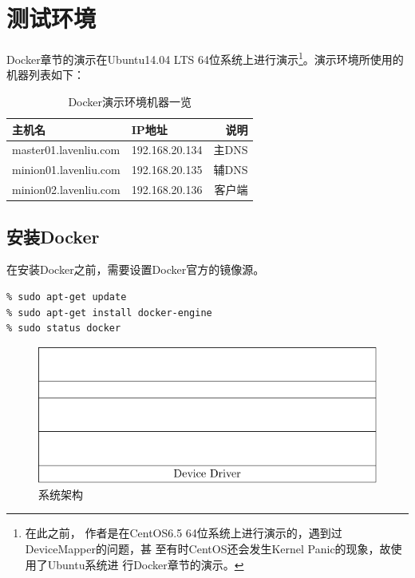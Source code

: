 \section{测试环境}
\label{sec:dockerTestEnv}

Docker章节的演示在Ubuntu14.04 LTS 64位系统上进行演示\footnote{在此之前，
  作者是在CentOS6.5 64位系统上进行演示的，遇到过DeviceMapper的问题，甚
  至有时CentOS还会发生Kernel Panic的现象，故使用了Ubuntu系统进
  行Docker章节的演示。}。演示环境所使用的机器列表如下：

\begin{table}[htbp]
  \centering
    \caption{Docker演示环境机器一览}
    \label{tab:dockerMachines}
    \begin{tabular}{llr}
      \toprule
      主机名     & IP地址 & 说明 \\
      \midrule
      master01.lavenliu.com  & 192.168.20.134 &  主DNS \\
      minion01.lavenliu.com  & 192.168.20.135 &  辅DNS \\
      minion02.lavenliu.com  & 192.168.20.136 &  客户端 \\
      \bottomrule
    \end{tabular}
\end{table}

\subsection{安装Docker}
\label{installDocker}

在安装Docker之前，需要设置Docker官方的镜像源。

\begin{verbatim}
% sudo apt-get update
% sudo apt-get install docker-engine
% sudo status docker
\end{verbatim}

\begin{figure}[hbtp]
  \centering
  \includegraphics{graph/os-arch-mps.pdf}
    \caption{系统架构}
  \label{fig:OSArch}
\end{figure}

